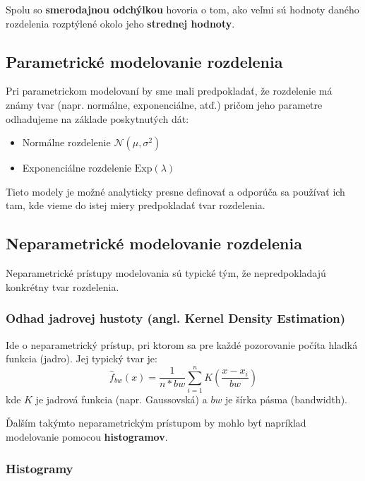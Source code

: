 Spolu so \textbf{smerodajnou odchýlkou} hovoria o tom, ako veľmi sú hodnoty daného rozdelenia rozptýlené okolo jeho \textbf{strednej hodnoty}.

\subsection{Parametrické modelovanie rozdelenia}

Pri parametrickom modelovaní by sme mali predpokladať, že rozdelenie má známy tvar (napr. normálne, exponenciálne, atď.) pričom jeho parametre odhadujeme na základe poskytnutých dát:

\begin{itemize}
  \item Normálne rozdelenie $\mathcal{N}(\mu, \sigma^2)$
  \item Exponenciálne rozdelenie $\text{Exp}(\lambda)$
\end{itemize}

Tieto modely je možné analyticky presne definovať a odporúča sa používať ich tam, kde vieme do istej miery predpokladať tvar rozdelenia.

\subsection{Neparametrické modelovanie rozdelenia}

Neparametrické prístupy modelovania sú typické tým, že nepredpokladajú konkrétny tvar rozdelenia.

\subsubsection{Odhad jadrovej hustoty (angl. Kernel Density Estimation)}

Ide o neparametrický prístup, pri ktorom sa pre každé pozorovanie počíta hladká funkcia (jadro). Jej typický tvar je:
\begin{equation}
\hat{f}_{bw}(x) = \frac{1}{n*bw} \sum_{i=1}^n K\left( \frac{x - x_i}{bw} \right)
\end{equation}
kde $K$ je jadrová funkcia (napr. Gaussovská) a $bw$ je šírka pásma (bandwidth).

Ďalším takýmto neparametrickým prístupom by mohlo byť napríklad modelovanie pomocou \textbf{histogramov}. 

\subsubsection{Histogramy}

